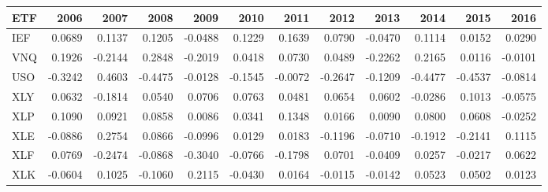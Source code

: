 \begin{tabular}{lrrrrrrrrrrr}
\toprule
ETF & 2006 & 2007 & 2008 & 2009 & 2010 & 2011 & 2012 & 2013 & 2014 & 2015 & 2016 \\
\midrule
IEF & 0.0689 & 0.1137 & 0.1205 & -0.0488 & 0.1229 & 0.1639 & 0.0790 & -0.0470 & 0.1114 & 0.0152 & 0.0290 \\
VNQ & 0.1926 & -0.2144 & 0.2848 & -0.2019 & 0.0418 & 0.0730 & 0.0489 & -0.2262 & 0.2165 & 0.0116 & -0.0101 \\
USO & -0.3242 & 0.4603 & -0.4475 & -0.0128 & -0.1545 & -0.0072 & -0.2647 & -0.1209 & -0.4477 & -0.4537 & -0.0814 \\
XLY & 0.0632 & -0.1814 & 0.0540 & 0.0706 & 0.0763 & 0.0481 & 0.0654 & 0.0602 & -0.0286 & 0.1013 & -0.0575 \\
XLP & 0.1090 & 0.0921 & 0.0858 & 0.0086 & 0.0341 & 0.1348 & 0.0166 & 0.0090 & 0.0800 & 0.0608 & -0.0252 \\
XLE & -0.0886 & 0.2754 & 0.0866 & -0.0996 & 0.0129 & 0.0183 & -0.1196 & -0.0710 & -0.1912 & -0.2141 & 0.1115 \\
XLF & 0.0769 & -0.2474 & -0.0868 & -0.3040 & -0.0766 & -0.1798 & 0.0701 & -0.0409 & 0.0257 & -0.0217 & 0.0622 \\
XLK & -0.0604 & 0.1025 & -0.1060 & 0.2115 & -0.0430 & 0.0164 & -0.0115 & -0.0142 & 0.0523 & 0.0502 & 0.0123 \\
\bottomrule
\end{tabular}

